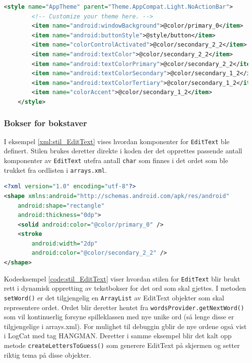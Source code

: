 \begin{lstlisting}[language=XML, caption=Deler av \texttt{styles.xml}, label=xml:stil_styles]
    <style name="AppTheme" parent="Theme.AppCompat.Light.NoActionBar">
        <!-- Customize your theme here. -->
        <item name="android:windowBackground">@color/primary_0</item>
        <item name="android:buttonStyle">@style/button</item>
        <item name="colorControlActivated">@color/secondary_2_2</item>
        <item name="android:textColor">@color/secondary_2_2</item>
        <item name="android:textColorPrimary">@color/secondary_2_2</item>
        <item name="android:textColorSecondary">@color/secondary_1_2</item>
        <item name="android:textColorTertiary">@color/secondary_1_2</item>
        <item name="colorAccent">@color/secondary_1_2</item>
    </style>
\end{lstlisting}

\subsubsection*{Bokser for bokstaver}
I eksempel \ref{xml:stil_EditText} vises hvordan komponenter for \texttt{EditText} ble definert. Stilen brukes deretter direkte i koden der det opprettes passende antall komponenter av \texttt{EditText} utefra antall \texttt{char} som finnes i det ordet som ble trukket fra ordlisten i \texttt{arrays.xml}. 
\begin{lstlisting}[language=XML, caption=Stil for \texttt{EditText}, label=xml:stil_EditText]
<?xml version="1.0" encoding="utf-8"?>
<shape xmlns:android="http://schemas.android.com/apk/res/android"
    android:shape="rectangle"
    android:thickness="0dp">
    <solid android:color="@color/primary_0" />
    <stroke
        android:width="2dp"
        android:color="@color/secondary_2_2" />
</shape>
\end{lstlisting}

Kodeeksempel \ref{code:stil_EditText} viser hvordan stilen for \texttt{EditText} blir brukt rett i dynamisk oppretting av tekstbokser for det ord som skal gjettes. I metoden \texttt{setWord()} er det tilgjengelig en \texttt{ArrayList} av EditText objekter som skal representere ordet. Ordet blir deretter hentet fra \texttt{wordsProvider.getNextWord()} som vil kontinuerlig forsyne spilleklassen med nye unike ord (så lenge disse er tilgjengelige i arrays.xml). For mulighet til debuggin gblir de nye ordene også vist i LogCat med tag HANGMAN. Deretter i samme eksempel blir det kalt opp metode \texttt{createLettersToGuess()} som generere EditText på skjermen og setter riktig tema på disse objekter.

